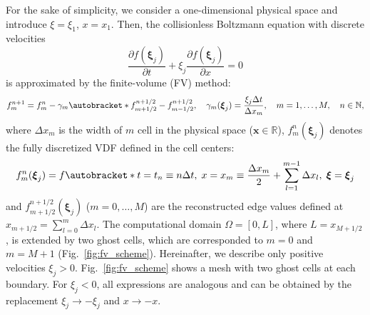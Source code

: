 \documentclass{elsarticle} %
\newcommand{\pder}[2][]{\frac{\partial#1}{\partial#2}}
\DeclarePairedDelimiter\autobracket()       %
\newcommand{\br}[1]{\autobracket*{#1}}
\newcommand{\bxi}{\boldsymbol{\xi}}
\newcommand{\bx}{\boldsymbol{x}}
\begin{document}
For the sake of simplicity, we consider a one-dimensional physical space
and introduce \(\xi = \xi_1\), \(x = x_1\).
Then, the collisionless Boltzmann equation with discrete velocities
\begin{equation}\label{eq:transport}
    \pder[f(\bxi_j)]{t} + \xi_j\pder[f(\bxi_j)]{x} = 0
\end{equation}
is approximated by the finite-volume (FV) method:
\begin{equation}\label{eq:finite_volume}
    f^{n+1}_m = f^n_m - \gamma_m\br{f^{n+1/2}_{m+1/2} - f^{n+1/2}_{m-1/2}}, \quad
    \gamma_m(\bxi_j) = \frac{\xi_j\Delta{t}}{\Delta{x_m}}, \quad
    m = 1,\dots,M, \quad n\in\mathbb{N},
\end{equation}
where \(\Delta{x_m}\) is the width of \(m\) cell in the physical space (\(\bx\in\mathbb{R}\)),
\(f^n_m(\bxi_j)\) denotes the fully discretized VDF defined in the cell centers:
\begin{equation}\label{eq:vdf_fv}
    f^n_m(\bxi_j) = f\br{
        t = t_n \equiv n\Delta{t}, \;
        x = x_m \equiv \frac{\Delta{x_m}}2 + \sum_{l=1}^{m-1}\Delta{x_l}, \;
        \bxi = \bxi_j
    }
\end{equation}
and \(f^{n+1/2}_{m+1/2}(\bxi_j)\) (\(m = 0,\dots,M\)) are the reconstructed edge values
defined at \(x_{m+1/2} = \sum_{l=0}^m\Delta{x_l}\).
The computational domain \(\Omega = [0,L]\), where \(L = x_{M+1/2}\), is extended by two ghost cells,
which are corresponded to \(m=0\) and \(m=M+1\) (Fig.~\ref{fig:fv_scheme}).
Hereinafter, we describe only positive velocities \(\xi_j>0\).
Fig.~\ref{fig:fv_scheme} shows a mesh with two ghost cells at each boundary.
For \(\xi_j<0\), all expressions are analogous
and can be obtained by the replacement \(\xi_j\to-\xi_j\) and \(x\to-x\).
\end{document}
